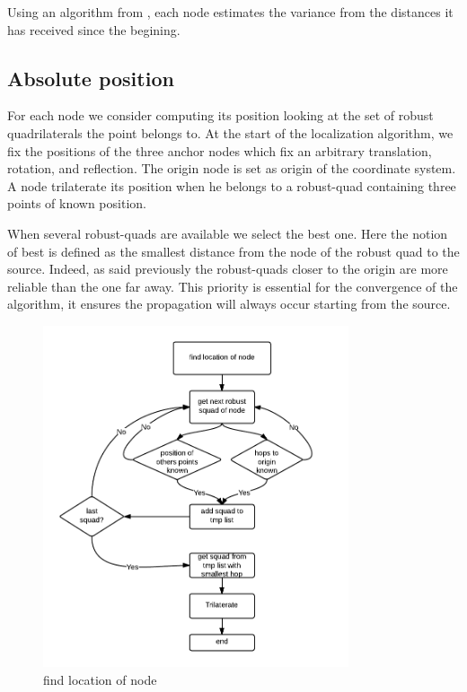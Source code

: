 \documentclass[letterpaper, 10 pt, conference]{ieeeconf}  %
\begin{document}

Using an algorithm from \cite{Knuth} , each node estimates the variance from the distances it has received since the begining.




\subsection{Absolute position}
For each node we consider computing its position looking at the set of robust quadrilaterals the point belongs to. At the start of the localization algorithm, we fix the positions of the three anchor nodes which fix an arbitrary translation, rotation, and reflection. The origin node is set as origin of the coordinate system. A node trilaterate its position when he belongs to a robust-quad containing three points of known position.

When several robust-quads are available we select the best one. Here the notion of best is defined as the smallest distance from the node of the robust quad to the source. Indeed, as said previously the robust-quads closer to the origin are more reliable than the one far away. This priority is essential for the convergence of the algorithm, it ensures the propagation will always occur starting from the source.


\begin{figure}[ht!]
\centering
\includegraphics[width=90mm]{find_location.png}
\caption{find location of node}
\label{overflow}
\end{figure}
\end{document}
